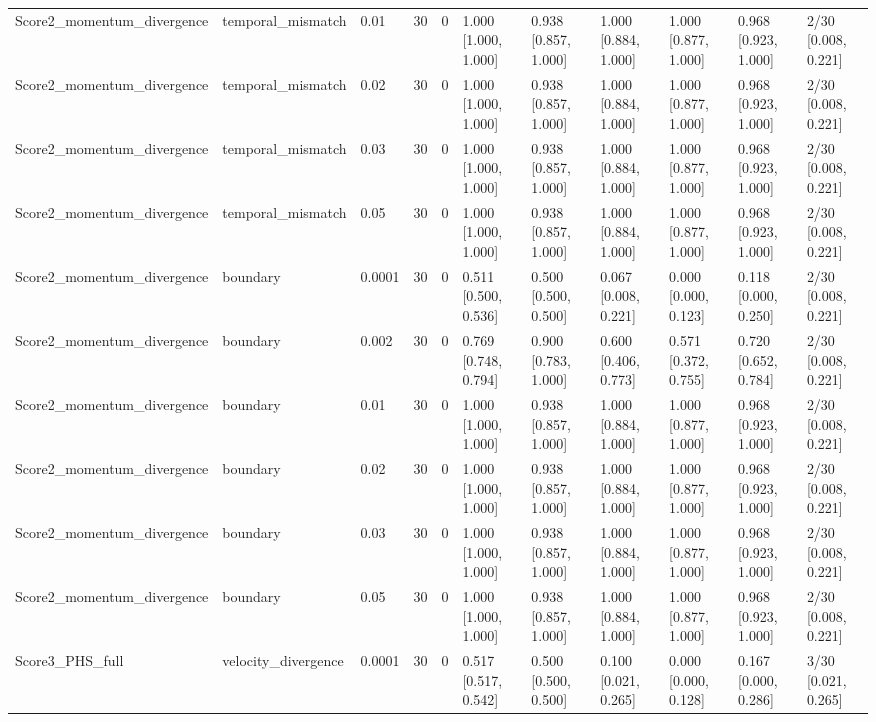 \begin{longtable}{lllllllllll}
Score2\_momentum\_divergence & temporal\_mismatch & 0.01 & 30 & 0 & 1.000 [1.000, 1.000] & 0.938 [0.857, 1.000] & 1.000 [0.884, 1.000] & 1.000 [0.877, 1.000] & 0.968 [0.923, 1.000] & 2/30 [0.008, 0.221] \\
Score2\_momentum\_divergence & temporal\_mismatch & 0.02 & 30 & 0 & 1.000 [1.000, 1.000] & 0.938 [0.857, 1.000] & 1.000 [0.884, 1.000] & 1.000 [0.877, 1.000] & 0.968 [0.923, 1.000] & 2/30 [0.008, 0.221] \\
Score2\_momentum\_divergence & temporal\_mismatch & 0.03 & 30 & 0 & 1.000 [1.000, 1.000] & 0.938 [0.857, 1.000] & 1.000 [0.884, 1.000] & 1.000 [0.877, 1.000] & 0.968 [0.923, 1.000] & 2/30 [0.008, 0.221] \\
Score2\_momentum\_divergence & temporal\_mismatch & 0.05 & 30 & 0 & 1.000 [1.000, 1.000] & 0.938 [0.857, 1.000] & 1.000 [0.884, 1.000] & 1.000 [0.877, 1.000] & 0.968 [0.923, 1.000] & 2/30 [0.008, 0.221] \\
Score2\_momentum\_divergence & boundary & 0.0001 & 30 & 0 & 0.511 [0.500, 0.536] & 0.500 [0.500, 0.500] & 0.067 [0.008, 0.221] & 0.000 [0.000, 0.123] & 0.118 [0.000, 0.250] & 2/30 [0.008, 0.221] \\
Score2\_momentum\_divergence & boundary & 0.002 & 30 & 0 & 0.769 [0.748, 0.794] & 0.900 [0.783, 1.000] & 0.600 [0.406, 0.773] & 0.571 [0.372, 0.755] & 0.720 [0.652, 0.784] & 2/30 [0.008, 0.221] \\
Score2\_momentum\_divergence & boundary & 0.01 & 30 & 0 & 1.000 [1.000, 1.000] & 0.938 [0.857, 1.000] & 1.000 [0.884, 1.000] & 1.000 [0.877, 1.000] & 0.968 [0.923, 1.000] & 2/30 [0.008, 0.221] \\
Score2\_momentum\_divergence & boundary & 0.02 & 30 & 0 & 1.000 [1.000, 1.000] & 0.938 [0.857, 1.000] & 1.000 [0.884, 1.000] & 1.000 [0.877, 1.000] & 0.968 [0.923, 1.000] & 2/30 [0.008, 0.221] \\
Score2\_momentum\_divergence & boundary & 0.03 & 30 & 0 & 1.000 [1.000, 1.000] & 0.938 [0.857, 1.000] & 1.000 [0.884, 1.000] & 1.000 [0.877, 1.000] & 0.968 [0.923, 1.000] & 2/30 [0.008, 0.221] \\
Score2\_momentum\_divergence & boundary & 0.05 & 30 & 0 & 1.000 [1.000, 1.000] & 0.938 [0.857, 1.000] & 1.000 [0.884, 1.000] & 1.000 [0.877, 1.000] & 0.968 [0.923, 1.000] & 2/30 [0.008, 0.221] \\
Score3\_PHS\_full & velocity\_divergence & 0.0001 & 30 & 0 & 0.517 [0.517, 0.542] & 0.500 [0.500, 0.500] & 0.100 [0.021, 0.265] & 0.000 [0.000, 0.128] & 0.167 [0.000, 0.286] & 3/30 [0.021, 0.265] \\

\end{longtable}
